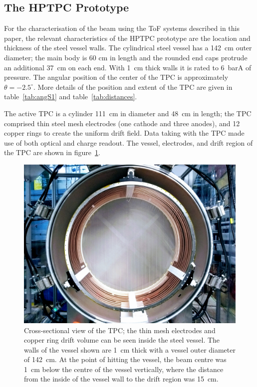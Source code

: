 \subsection{The HPTPC Prototype}
For the characterisation of the beam using the ToF systems described in this paper, the relevant characteristics of the HPTPC prototype are the location and thickness of the steel vessel walls.
The cylindrical steel vessel has a 142~cm outer diameter; the main body is 60 cm in length and the rounded end caps protrude an additional 37~cm on each end.
With 1~cm thick walls it is rated to 6~barA of pressure. 
The angular position of the center of the TPC is approximately $\theta = -2.5^{\circ}$. 
More details of the position and extent of the TPC are given in table~\ref{tab:angS1} and table~\ref{tab:distances}.
 
The active TPC is a cylinder 111~cm in diameter and 48~cm in length; the TPC comprised thin steel mesh electrodes (one cathode and three anodes), and 12 copper rings to create the uniform drift field. 
Data taking with the TPC made use of both optical and charge readout.
The vessel, electrodes, and drift region of the TPC are shown in figure~\ref{fig:TPC}.

\begin{figure}
  \centering
  \includegraphics[width=\linewidth]{files/Figures/IMG_20180830_170947192-3.jpg}
  \caption{Cross-sectional view of the TPC; the thin mesh electrodes and copper ring drift volume can be seen inside the steel vessel. The walls of the vessel shown are 1~cm thick with a vessel outer diameter of 142~cm. At the point of hitting the vessel, the beam centre was 1~cm below the centre of the vessel vertically, where the distance from the inside of the vessel wall to the drift region was 15~cm.}
   \label{fig:TPC}
\end{figure}

